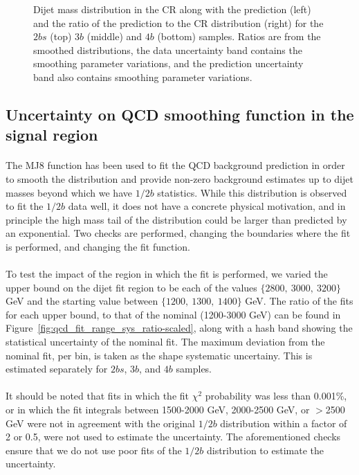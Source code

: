 \begin{figure}[htbp!]
\begin{center}
\caption{Dijet mass distribution in the CR along with the prediction (left) and the ratio of the prediction to the CR distribution (right)  for the $2bs$ (top) $3b$ (middle) and $4b$ (bottom) samples.  Ratios are from the smoothed distributions, the data uncertainty band contains the smoothing parameter variations, and the prediction uncertainty band also contains smoothing parameter variations.}
\label{fig:qcd_shape_fit}
\end{center}
\end{figure}

\subsection{Uncertainty on QCD smoothing function in the signal region}
\label{unc-smooth-qcd-in-sr}

\paragraph{}
The MJ8 function has been used to fit the QCD background prediction in order to smooth the distribution and provide non-zero background estimates up to dijet masses beyond which we have $1/2b$ statistics.  While this distribution is  observed to fit the $1/2b$ data well, it does not have a concrete physical motivation, and in principle the high mass tail of the distribution could be larger than predicted by an exponential.  Two checks are performed, changing the boundaries where the fit is performed, and changing the fit function.

\paragraph{}
To test the impact of the region in which the fit is performed, we varied the upper bound on the dijet fit region to be each of the values $\{2800,\ 3000,\ 3200\}$ GeV and the starting value between $\{1200,\ 1300,\ 1400\}$ GeV.  The ratio of the fits for each upper bound, to that of the nominal (1200-3000 GeV) can be found in Figure~\ref{fig:qcd_fit_range_sys_ratio-scaled}, along with a hash band showing the statistical uncertainty of the nominal fit.  The maximum deviation from the nominal fit, per bin, is taken as the shape systematic uncertainy.  This is estimated separately for $2bs$, $3b$, and $4b$ samples.

\paragraph{}
It should be noted that fits in which the fit $\chi^2$ probability was less than 0.001\%, or in which the fit integrals between 1500-2000 GeV, 2000-2500 GeV, or $>$2500 GeV were not in agreement with the original $1/2b$ distribution within a factor of 2 or 0.5, were not used to estimate the uncertainty.  The aforementioned checks ensure that we do not use poor fits of the $1/2b$ distribution to estimate the uncertainty.

